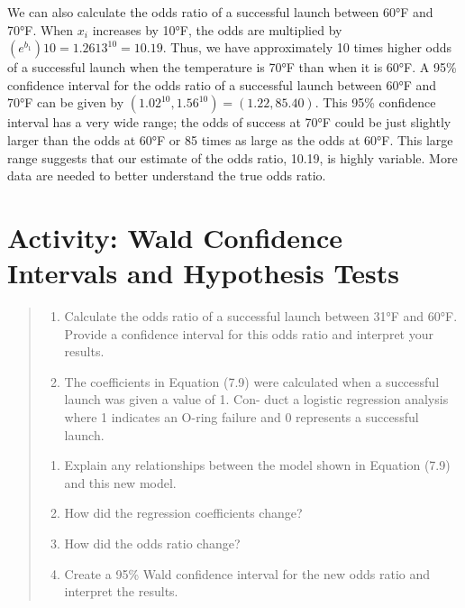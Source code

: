 \documentclass[
]{report}
\providecommand{\tightlist}{%
  \setlength{\itemsep}{0pt}\setlength{\parskip}{0pt}}
\begin{document}
We can also calculate the odds ratio of a successful launch between 60°F and 70°F. When \(x_i\)
increases by 10°F, the odds are multiplied by \((e^{b_1})10 = 1.2613^{10} = 10.19\). Thus, we have approximately
10 times higher odds of a successful launch when the temperature is 70°F than when it is 60°F. A 95\%
confidence interval for the odds ratio of a successful launch between 60°F and 70°F can be given by
\((1.02^10, 1.56^10) = (1.22, 85.40)\). This 95\% confidence interval has a very wide range; the odds of success
at 70°F could be just slightly larger than the odds at 60°F or 85 times as large as the odds at 60°F. This
large range suggests that our estimate of the odds ratio, 10.19, is highly variable. More data are needed to
better understand the true odds ratio.

\section*{Activity: Wald Confidence Intervals and Hypothesis Tests}\label{activity-wald-confidence-intervals-and-hypothesis-tests}

\begin{quote}
\begin{enumerate}
\def\labelenumi{\arabic{enumi}.}
\setcounter{enumi}{11}
\tightlist
\item
  Calculate the odds ratio of a successful launch between 31°F and 60°F. Provide a confidence interval
  for this odds ratio and interpret your results.
\item
  The coefficients in Equation (7.9) were calculated when a successful launch was given a value of 1. Con-
  duct a logistic regression analysis where 1 indicates an O-ring failure and 0 represents a successful launch.
\end{enumerate}

\begin{enumerate}
\def\labelenumi{\alph{enumi}.}
\tightlist
\item
  Explain any relationships between the model shown in Equation (7.9) and this new model.
\item
  How did the regression coefficients change?
\item
  How did the odds ratio change?
\item
  Create a 95\% Wald confidence interval for the new odds ratio and interpret the results.
\end{enumerate}
\end{quote}
\end{document}
